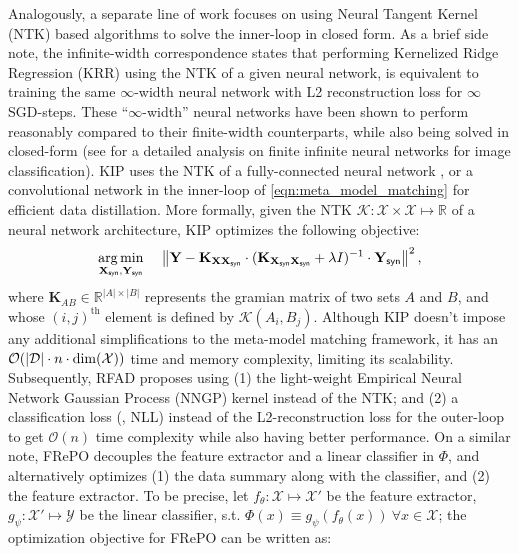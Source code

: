 \documentclass[10pt]{article} %
\begin{document}
Analogously, a separate line of work focuses on using Neural Tangent Kernel (NTK) \citep{ntk} based algorithms to solve the inner-loop in closed form. As a brief side note, the infinite-width correspondence states that performing Kernelized Ridge Regression (KRR) using the NTK of a given neural network, is equivalent to training the same $\infty$-width neural network with L2 reconstruction loss for $\infty$ SGD-steps. These ``$\infty$-width'' neural networks have been shown to perform reasonably compared to their finite-width counterparts, while also being solved in closed-form (see \citet{finite_vs_infinite_2} for a detailed analysis on finite \vs infinite neural networks for image classification). KIP uses the NTK of a fully-connected neural network \citep{kip}, or a convolutional network \citep{kip_conv} in the inner-loop of \cref{eqn:meta_model_matching} for efficient data distillation. More formally, given the NTK $\mathcal{K} : \mathcal{X} \times \mathcal{X} \mapsto \mathbb{R}$ of a neural network architecture, KIP optimizes the following objective:
\begin{equation} \label{eqn:kip_optimization}
\begin{gathered}
    \underset{\mathbf{X}_{\mathsf{syn}}, \mathbf{Y}_{\mathsf{syn}}}{\operatorname{arg} \operatorname{min}} \hspace{0.4cm} \left\lVert \mathbf{Y} - \mathbf{K}_{\mathbf{X} \mathbf{X}_{\mathsf{syn}}} \cdot (\mathbf{K}_{\mathbf{X}_{\mathsf{syn}} \mathbf{X}_{\mathsf{syn}}} + \lambda I)^{-1} \cdot \mathbf{Y}_{\mathsf{syn}} \right\rVert^2,
\end{gathered}
\end{equation}
where $\mathbf{K}_{AB} \in \mathbb{R}^{|A|\times|B|}$ represents the gramian matrix of two sets $A$ and $B$, and whose $(i, j)^{\text{th}}$ element is defined by $\mathcal{K}(A_i, B_j)$. Although KIP doesn't impose any additional simplifications to the meta-model matching framework, 
it has an $\mathcal{O}(|\mathcal{D}| \cdot n \cdot \dim(\mathcal{X}))$ time and memory complexity,
limiting its scalability. Subsequently, RFAD \citep{rfad} proposes using (1) the light-weight Empirical Neural Network Gaussian Process (NNGP) kernel \citep{nngp} instead of the NTK; and (2) a classification loss (\eg, NLL) instead of the L2-reconstruction loss for the outer-loop to get $\mathcal{O}(n)$ time complexity while also having better performance. On a similar note, FRePO \citep{frepo} decouples the feature extractor and a linear classifier in $\Phi$, and alternatively optimizes (1) the data summary along with the classifier, and (2) the feature extractor. To be precise, let $f_{\theta} : \mathcal{X} \mapsto \mathcal{X}'$ be the feature extractor, $g_{\psi} : \mathcal{X}' \mapsto \mathcal{Y}$ be the linear classifier, s.t. $\Phi(x) \equiv g_{\psi}(f_{\theta}(x)) ~\forall x \in \mathcal{X}$; the optimization objective for FRePO can be written as:
\end{document}
